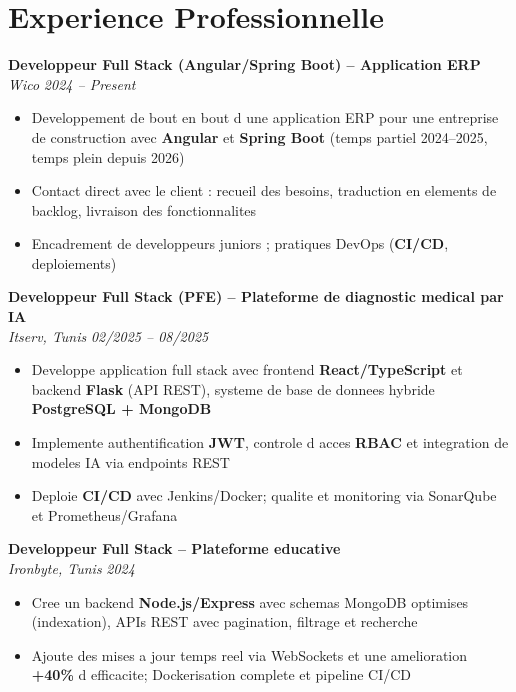 \documentclass[10pt,a4paper]{article}
\begin{document}
\vspace{6pt}

\section*{Experience Professionnelle}
{\small

\textbf{Developpeur Full Stack (Angular/Spring Boot) -- Application ERP}\\[1pt]
\textit{Wico} \hfill \textit{2024 -- Present}
\begin{itemize}
  \item Developpement de bout en bout d une application ERP pour une entreprise de construction avec \textbf{Angular} et \textbf{Spring Boot} (temps partiel 2024--2025, temps plein depuis 2026)
  \item Contact direct avec le client : recueil des besoins, traduction en elements de backlog, livraison des fonctionnalites
  \item Encadrement de developpeurs juniors ; pratiques DevOps (\textbf{CI/CD}, deploiements)
\end{itemize}

\vspace{3pt}
\textbf{Developpeur Full Stack (PFE) -- Plateforme de diagnostic medical par IA}\\[1pt]
\textit{Itserv, Tunis} \hfill \textit{02/2025 -- 08/2025}
\begin{itemize}
  \item Developpe application full stack avec frontend \textbf{React/TypeScript} et backend \textbf{Flask} (API REST), systeme de base de donnees hybride \textbf{PostgreSQL + MongoDB}
  \item Implemente authentification \textbf{JWT}, controle d acces \textbf{RBAC} et integration de modeles IA via endpoints REST
  \item Deploie \textbf{CI/CD} avec Jenkins/Docker; qualite et monitoring via SonarQube et Prometheus/Grafana
\end{itemize}

\vspace{3pt}
\textbf{Developpeur Full Stack -- Plateforme educative}\\[1pt]
\textit{Ironbyte, Tunis} \hfill \textit{2024}
\begin{itemize}
  \item Cree un backend \textbf{Node.js/Express} avec schemas MongoDB optimises (indexation), APIs REST avec pagination, filtrage et recherche
  \item Ajoute des mises a jour temps reel via WebSockets et une amelioration \textbf{+40\%} d efficacite; Dockerisation complete et pipeline CI/CD
\end{itemize}

}
\end{document}
